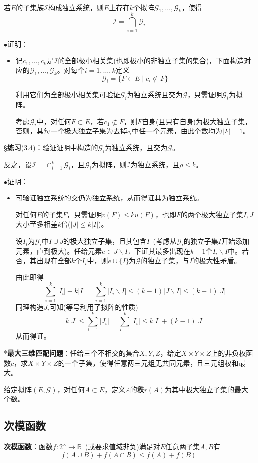 \documentclass[a4paper,UTF8,fontset=windows]{ctexart}
\newcommand{\exce}[2]{\S\textbf{练习}(#1)：{\kaishu #2}}
\newcommand{\proo}[1]{{\kaishu $\bullet$证明：
\begin{itemize}
    \item[] #1
\end{itemize}
}}
\begin{document}
\

若$E$的子集族$\mathcal{I}$构成独立系统，则$E$上存在$k$个拟阵$\mathcal{G}_1,\dots,\mathcal{G}_k$，使得
$$\mathcal{I}=\bigcap_{i=1}^k\mathcal{G}_i$$

\proo{
    记$c_1,\dots,c_k$是$\mathcal{I}$的全部极小相关集(也即极小的非独立子集的集合)，下面构造对应的$\mathcal{G}_1,\dots,\mathcal{G}_k$。对每个$i=1,\dots,k$定义
    $$\mathcal{G}_i=\{F\subset E\mid c_i\not\subset F\}$$

    利用它们为全部极小相关集可验证$\mathcal{G}_i$为独立系统且交为$\mathcal{G}$，只需证明$\mathcal{G}_i$为拟阵。
    
    考虑$\mathcal{G}_i$中，对任何$F\subset E$，若$c_1\not\subset F$，则$F$自身(且只有自身)为极大独立子集，否则，其每一个极大独立子集为去掉$c_i$中任一个元素，由此个数均为$|F|-1$。
}

\exce{3.4}{验证证明中构造的$\mathcal{G}_i$为独立系统，且交为$\mathcal{G}$。}

反之，设$\mathcal{I}=\cap_{i=1}^k\mathcal{G}_i$，且$\mathcal{G}_i$为拟阵，则$\mathcal{I}$为独立系统，且$\rho\le k$。

\proo{
    可验证独立系统的交仍为独立系统，从而得证其为独立系统。

    对任何$E$的子集$F$，只需证明$v(F)\le ku(F)$，也即$F$的两个极大独立子集$I,J$大小至多相差$k$倍($|J|\le k|I|$)。

    设$I_i$为$\mathcal{G}_i$中$I\cup J$的极大独立子集，且其包含$I$\ (考虑从$\mathcal{G}_i$的独立子集$I$开始添加元素，直到极大)。任给元素$e\in J\backslash I$，下证其最多出现在$k-1$个$I_i\backslash I$中。若否，其出现在全部$k$个$I_i$中，则$e\cup\{I\}$为$\mathcal{G}$的独立子集，与$I$的极大性矛盾。
    
    由此即得
    $$\sum_{i=1}^k|I_i|-k|I|=\sum_{i=1}^k|I_i\backslash I|\le(k-1)|J\backslash I|\le (k-1)|J|$$
    同理构造$J_i$可知(等号利用了拟阵的性质)
    $$k|J|\le\sum_{i=1}^k|J_i|=\sum_{i=1}^k|I_i|\le k|I|+(k-1)|J|$$
    从而得证。
}

*\textbf{最大三维匹配问题}：任给三个不相交的集合$X,Y,Z$，给定$X\times Y\times Z$上的非负权函数$c$，求$X\times Y\times Z$的一个子集，使得任意两三元组无共同元素，且三元组权和最大。

给定拟阵$(E,\mathcal{G})$，对任何$A\subset E$，定义$A$的\textbf{秩}$r(A)$为其中极大独立子集的最大个数。

\subsection{次模函数}
\textbf{次模函数}：函数$f:2^E\to\mathbb{R}$\ (或要求值域非负)满足对$E$任意两子集$A,B$有
$$f(A\cup B)+f(A\cap B)\le f(A)+f(B)$$
\end{document}
